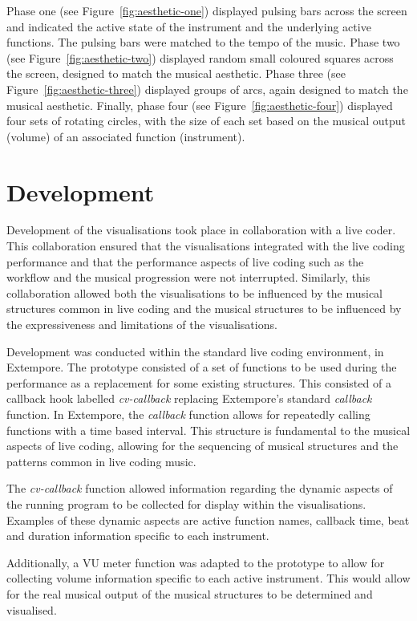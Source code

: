 Phase one (see Figure~\ref{fig:aesthetic-one}) displayed pulsing bars across the screen and indicated the active state of the instrument and the underlying active functions. The pulsing bars were matched to the tempo of the music. Phase two (see Figure~\ref{fig:aesthetic-two}) displayed random small coloured squares across the screen, designed to match the musical aesthetic. Phase three (see Figure~\ref{fig:aesthetic-three}) displayed groups of arcs, again designed to match the musical aesthetic. Finally, phase four (see Figure~\ref{fig:aesthetic-four}) displayed four sets of rotating circles, with the size of each set based on the musical output (volume) of an associated function (instrument).

\section{Development}

Development of the visualisations took place in collaboration with a live coder. This collaboration ensured that the visualisations integrated with the live coding performance and that the performance aspects of live coding such as the workflow and the musical progression were not interrupted. Similarly, this collaboration allowed both the visualisations to be influenced by the musical structures common in live coding and the musical structures to be influenced by the expressiveness and limitations of the visualisations.

Development was conducted within the standard live coding environment, in Extempore. The prototype consisted of a set of functions to be used during the performance as a replacement for some existing structures. This consisted of a callback hook labelled \textit{cv-callback} replacing Extempore's standard \textit{callback} function. In Extempore, the \textit{callback} function allows for repeatedly calling functions with a time based interval. This structure is fundamental to the musical aspects of live coding, allowing for the sequencing of musical structures and the patterns common in live coding music.

The \textit{cv-callback} function allowed information regarding the dynamic aspects of the running program to be collected for display within the visualisations. Examples of these dynamic aspects are active function names, callback time, beat and duration information specific to each instrument.

Additionally, a \ac{VU} meter function was adapted to the prototype to allow for collecting volume information specific to each active instrument. This would allow for the real musical output of the musical structures to be determined and visualised.

